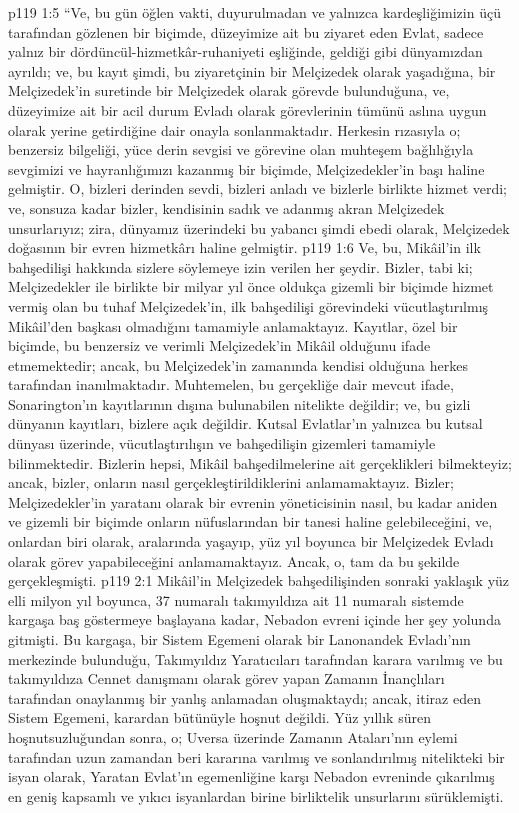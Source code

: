 \vs p119 1:5 “Ve, bu gün öğlen vakti, duyurulmadan ve yalnızca kardeşliğimizin üçü tarafından gözlenen bir biçimde, düzeyimize ait bu ziyaret eden Evlat, sadece yalnız bir dördüncül\hyp{}hizmetkâr\hyp{}ruhaniyeti eşliğinde, geldiği gibi dünyamızdan ayrıldı; ve, bu kayıt şimdi, bu ziyaretçinin bir Melçizedek olarak yaşadığına, bir Melçizedek’in suretinde bir Melçizedek olarak görevde bulunduğuna, ve, düzeyimize ait bir acil durum Evladı olarak görevlerinin tümünü aslına uygun olarak yerine getirdiğine dair onayla sonlanmaktadır. Herkesin rızasıyla o; benzersiz bilgeliği, yüce derin sevgisi ve görevine olan muhteşem bağlılığıyla sevgimizi ve hayranlığımızı kazanmış bir biçimde, Melçizedekler’in başı haline gelmiştir. O, bizleri derinden sevdi, bizleri anladı ve bizlerle birlikte hizmet verdi; ve, sonsuza kadar bizler, kendisinin sadık ve adanmış akran Melçizedek unsurlarıyız; zira, dünyamız üzerindeki bu yabancı şimdi ebedi olarak, Melçizedek doğasının bir evren hizmetkârı haline gelmiştir.
\vs p119 1:6 Ve, bu, Mikâil’in ilk bahşedilişi hakkında sizlere söylemeye izin verilen her şeydir. Bizler, tabi ki; Melçizedekler ile birlikte bir milyar yıl önce oldukça gizemli bir biçimde hizmet vermiş olan bu tuhaf Melçizedek’in, ilk bahşedilişi görevindeki vücutlaştırılmış Mikâil’den başkası olmadığını tamamiyle anlamaktayız. Kayıtlar, özel bir biçimde, bu benzersiz ve verimli Melçizedek’in Mikâil olduğunu ifade etmemektedir; ancak, bu Melçizedek’in zamanında kendisi olduğuna herkes tarafından inanılmaktadır. Muhtemelen, bu gerçekliğe dair mevcut ifade, Sonarington’ın kayıtlarının dışına bulunabilen nitelikte değildir; ve, bu gizli dünyanın kayıtları, bizlere açık değildir. Kutsal Evlatlar’ın yalnızca bu kutsal dünyası üzerinde, vücutlaştırılışın ve bahşedilişin gizemleri tamamiyle bilinmektedir. Bizlerin hepsi, Mikâil bahşedilmelerine ait gerçeklikleri bilmekteyiz; ancak, bizler, onların nasıl gerçekleştirildiklerini anlamamaktayız. Bizler; Melçizedekler’in yaratanı olarak bir evrenin yöneticisinin nasıl, bu kadar aniden ve gizemli bir biçimde onların nüfuslarından bir tanesi haline gelebileceğini, ve, onlardan biri olarak, aralarında yaşayıp, yüz yıl boyunca bir Melçizedek Evladı olarak görev yapabileceğini anlamamaktayız. Ancak, o, tam da bu şekilde gerçekleşmişti.
\vs p119 2:1 Mikâil’in Melçizedek bahşedilişinden sonraki yaklaşık yüz elli milyon yıl boyunca, 37 numaralı takımyıldıza ait 11 numaralı sistemde kargaşa baş göstermeye başlayana kadar, Nebadon evreni içinde her şey yolunda gitmişti. Bu kargaşa, bir Sistem Egemeni olarak bir Lanonandek Evladı’nın merkezinde bulunduğu, Takımyıldız Yaratıcıları tarafından karara varılmış ve bu takımyıldıza Cennet danışmanı olarak görev yapan Zamanın İnançlıları tarafından onaylanmış bir yanlış anlamadan oluşmaktaydı; ancak, itiraz eden Sistem Egemeni, karardan bütünüyle hoşnut değildi. Yüz yıllık süren hoşnutsuzluğundan sonra, o; Uversa üzerinde Zamanın Ataları’nın eylemi tarafından uzun zamandan beri kararına varılmış ve sonlandırılmış nitelikteki bir isyan olarak, Yaratan Evlat’ın egemenliğine karşı Nebadon evreninde çıkarılmış en geniş kapsamlı ve yıkıcı isyanlardan birine birliktelik unsurlarını sürüklemişti.
